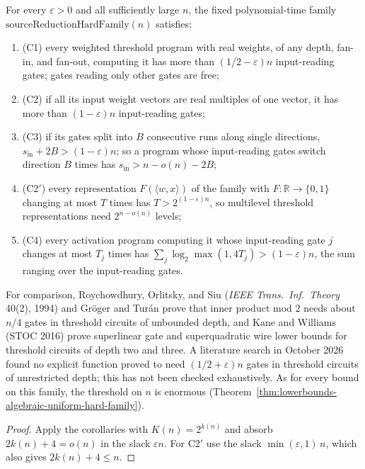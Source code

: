 \begin{theorem}
  \label{thm:lowerbounds-threshold-family-bounds}
  \leanok
  For every $\varepsilon>0$ and all sufficiently large $n$, the fixed
  polynomial-time family $\mathrm{sourceReductionHardFamily}(n)$ satisfies:
  \begin{enumerate}
    \item (C1) every weighted threshold program with real weights, of any depth,
      fan-in, and fan-out, computing it has more than $(1/2-\varepsilon)n$
      input-reading gates; gates reading only other gates are free;
    \item (C2) if all its input weight vectors are real multiples of one vector, it
      has more than $(1-\varepsilon)n$ input-reading gates;
    \item (C3) if its gates split into $B$ consecutive runs along single
      directions, $s_{\mathrm{in}}+2B>(1-\varepsilon)n$; so a program whose
      input-reading gates switch direction $B$ times has
      $s_{\mathrm{in}}>n-o(n)-2B$;
    \item (C2$'$) every representation $F(\langle w,x\rangle)$ of the family with
      $F:\mathbb{R}\to\{0,1\}$ changing at most $T$ times has
      $T>2^{(1-\varepsilon)n}$, so multilevel threshold representations need
      $2^{n-o(n)}$ levels;
    \item (C4) every activation program computing it whose input-reading gate $j$
      changes at most $T_j$ times has $\sum_j\log_2\max(1,4T_j)>(1-\varepsilon)n$,
      the sum ranging over the input-reading gates.
  \end{enumerate}

  For comparison, Roychowdhury, Orlitsky, and Siu (\emph{IEEE Trans.\ Inf.\
  Theory} 40(2), 1994) and Gr\"oger and Tur\'an prove that inner product mod $2$
  needs about $n/4$ gates in threshold circuits of unbounded depth, and Kane and
  Williams (STOC 2016) prove superlinear gate and superquadratic wire lower bounds
  for threshold circuits of depth two and three. A literature search in October
  2026 found no explicit function proved to need $(1/2+\varepsilon)n$ gates in
  threshold circuits of unrestricted depth; this has not been checked
  exhaustively. As
  for every bound on this family, the threshold on $n$ is enormous
  (Theorem~\ref{thm:lowerbounds-algebraic-uniform-hard-family}).
\end{theorem}
\begin{proof}
  \leanok
  Apply the corollaries with $K(n)=2^{k(n)}$ and absorb $2k(n)+4=o(n)$ in the
  slack $\varepsilon n$. For C2$'$ use the slack $\min(\varepsilon,1)\,n$, which
  also gives $2k(n)+4\le n$.
\end{proof}

